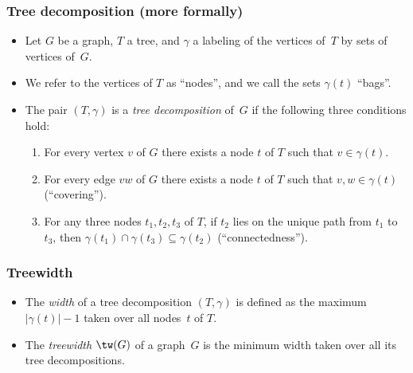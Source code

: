 \begin{frame}[label=treedecomp,shrink=2]
\begin{itemize}


  \end{itemize}
\end{frame}


\begin{frame}
  \frametitle{Tree decomposition (more formally)}
  \begin{itemize}
  \item Let $G$ be a graph, $T$ a tree, and $\gamma$ a labeling
    of the vertices of~$T$ by sets of vertices of~$G$. 
  \item We refer to the
    vertices of $T$ as ``nodes'', and we call the sets $\gamma(t)$ ``bags''.
  \item The pair $( T, \gamma )$ is a \emph{tree decomposition} of~$G$ if
    the following three conditions hold:
    \begin{enumerate}
    \item For every vertex $v$ of $G$  there exists a node $t$ of $T$ 
      such that $v \in \gamma(t)$.
    \item For every edge $vw$ of $G$ there exists a node $t$ of $T$ such
      that $v,w \in \gamma(t)$ (``covering'').
    \item For any three nodes $t_1, t_2, t_3$ of $T$, if $t_2$ lies on
      the unique path from $t_1$ to~$t_3$, then $\gamma(t_1) \cap
      \gamma(t_3) \subseteq \gamma(t_2)$ (``connectedness'').
    \end{enumerate} 
  \end{itemize}    
\end{frame}


\begin{frame}
  \frametitle{Treewidth}
  \begin{itemize}
  \item The \emph{width} of a tree decomposition $( T, \gamma )$ is defined as
    the maximum $|\gamma(t)|-1$ taken over all nodes~$t$ of $T$. 
  \item The \emph{treewidth} $\tw(G)$ of a graph~$G$ is the minimum width taken
    over all its tree decompositions.
  \end{itemize}
\end{frame}  


